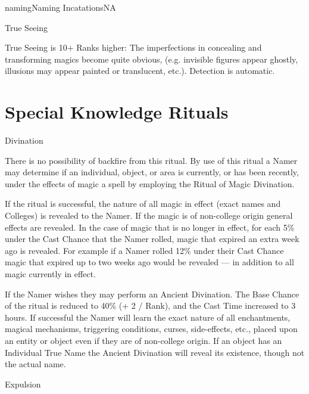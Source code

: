 \begin{College}[2.0]{naming}{Naming Incatations}{NA}
\begin{spell}[S-10]{True Seeing}
\begin{effects}
True Seeing is 10+ Ranks higher: The imperfections in concealing and
transforming magics become quite obvious, (e.g.  invisible figures
appear ghostly, illusions may appear painted or translucent,
etc.). Detection is automatic.
\end{effects}
\end{spell}

\section{Special Knowledge Rituals}

\begin{ritual}[R-1]{Divination}

\begin{effects}
There is no possibility of backfire from this ritual.  By use of this
ritual a Namer may determine if an individual, object, or area is
currently, or has been recently, under the effects of magic a spell by
employing the Ritual of Magic Divination.

If the ritual is successful, the nature of all magic in effect (exact
names and Colleges) is revealed to the Namer.  If the magic is of
non-college origin general effects are revealed.  In the case of magic
that is no longer in effect, for each 5\% under the Cast Chance that
the Namer rolled, magic that expired an extra week ago is revealed.
For example if a Namer rolled 12\% under their Cast Chance magic that
expired up to two weeks ago would be revealed — in addition to all
magic currently in effect.

If the Namer wishes they may perform an Ancient Divination.  The Base
Chance of the ritual is reduced to 40\% (+ 2 / Rank), and the Cast
Time increased to 3 hours.  If successful the Namer will learn the
exact nature of all enchantments, magical mechanisms, triggering
conditions, curses, side-effects, etc., placed upon an entity or
object even if they are of non-college origin.  If an object has an
Individual True Name the Ancient Divination will reveal its existence,
though not the actual name.
\end{effects}
\end{ritual}

\begin{ritual}[R-2]{Expulsion}


\end{ritual}
\end{College}
